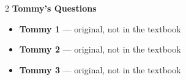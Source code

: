\documentclass[11pt]{article}
\begin{document}
\begin{multicols}{2}
\smallskip
\noindent\textbf{Tommy's Questions}
\begin{itemize}[leftmargin=1.6em,itemsep=1pt,topsep=2pt]
  \item[] \textbf{Tommy 1} --- original, not in the textbook
  \item[] \textbf{Tommy 2} --- original, not in the textbook
  \item[] \textbf{Tommy 3} --- original, not in the textbook
\end{itemize}
\end{multicols}
\end{document}
